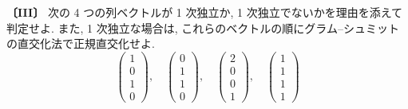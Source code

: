 \noindent\textbf{〔III〕}
次の 4 つの列ベクトルが 1 次独立か, 1 次独立でないかを理由を添えて判定せよ.
また, 1 次独立な場合は, これらのベクトルの順にグラム–シュミットの直交化法で正規直交化せよ.
\[
\begin{pmatrix}1\\0\\1\\0\end{pmatrix},\quad
\begin{pmatrix}0\\1\\1\\0\end{pmatrix},\quad
\begin{pmatrix}2\\0\\0\\1\end{pmatrix},\quad
\begin{pmatrix}1\\1\\1\\1\end{pmatrix}
\]
